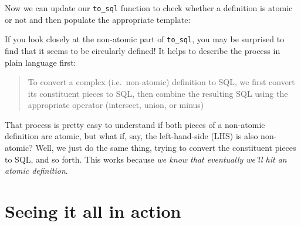 \documentclass[]{book}
\newenvironment{Shaded}{\begin{snugshade}}{\end{snugshade}}
\newcommand{\CommentTok}[1]{\textcolor[rgb]{0.56,0.35,0.01}{\textit{#1}}}
\newcommand{\ControlFlowTok}[1]{\textcolor[rgb]{0.13,0.29,0.53}{\textbf{#1}}}
\newcommand{\DataTypeTok}[1]{\textcolor[rgb]{0.13,0.29,0.53}{#1}}
\newcommand{\KeywordTok}[1]{\textcolor[rgb]{0.13,0.29,0.53}{\textbf{#1}}}
\newcommand{\NormalTok}[1]{#1}
\newcommand{\OperatorTok}[1]{\textcolor[rgb]{0.81,0.36,0.00}{\textbf{#1}}}
\newcommand{\StringTok}[1]{\textcolor[rgb]{0.31,0.60,0.02}{#1}}
\begin{document}
Now we can update our \texttt{to\_sql} function to check whether a definition is atomic or not and then populate the appropriate template:

\begin{Shaded}
\end{Shaded}

If you look closely at the non-atomic part of \texttt{to\_sql}, you may be surprised to find that it seems to be circularly defined! It helps to describe the process in plain language first:

\begin{quote}
To convert a complex (i.e.~non-atomic) definition to SQL, we first convert its constituent pieces to SQL, then combine the resulting SQL using the appropriate operator (intersect, union, or minus)
\end{quote}

That process is pretty easy to understand if both pieces of a non-atomic definition are atomic, but what if, say, the left-hand-side (LHS) is also non-atomic? Well, we just do the same thing, trying to convert the constituent pieces to SQL, and so forth. This works because \emph{we know that eventually we'll hit an atomic definition}.

\hypertarget{seeing-it-all-in-action}{%
\section{Seeing it all in action}\label{seeing-it-all-in-action}}
\end{document}

